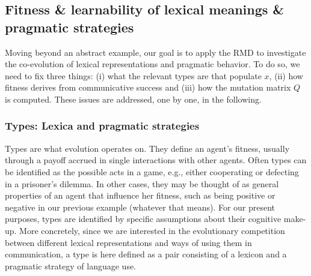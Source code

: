 \documentclass[a4paper, 11pt]{article}
\theoremstyle{Satz}
\begin{document}
\subsection{Fitness \& learnability of lexical meanings \& pragmatic strategies}
\label{sec:fitn--learn}


Moving beyond an abstract example, our goal is to apply the RMD to investigate the co-evolution
of lexical representations and pragmatic behavior. To do so, we need to fix three things: (i) what the
relevant types are that populate $x$, (ii) how fitness derives from communicative success and (iii) how the
mutation matrix $Q$ is computed. These issues are addressed, one by one, in the following.

\subsubsection{Types: Lexica and pragmatic strategies}
\label{sec:languages+use}
Types are what evolution operates on. They define an agent's fitness, usually through a payoff
accrued in single interactions with other agents. Often types can be identified as the possible
acts in a game, e.g., either cooperating or defecting in a prisoner's dilemma. In other cases,
they may be thought of as general properties of an agent that influence her fitness, such as
being positive or negative in our previous example (whatever that means). For our present
purposes, types are identified by specific assumptions about their cognitive
make-up. More concretely, since we are interested in the evolutionary competition between different lexical representations and ways of using them in communication, a type is here defined as a pair consisting of a lexicon and a pragmatic strategy of language use.
\end{document}
